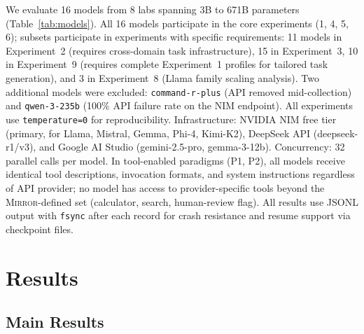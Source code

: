 \documentclass[10pt]{article}
\newcommand{\mirror}{\textsc{Mirror}}
\begin{document}


We evaluate 16 models from 8 labs spanning 3B to 671B parameters
(Table~\ref{tab:models}). All 16 models participate in the core experiments (1, 4, 5, 6); subsets participate in experiments with specific requirements: 11 models in Experiment~2 (requires cross-domain task infrastructure), 15 in Experiment~3, 10 in Experiment~9 (requires complete Experiment~1 profiles for tailored task generation), and 3 in Experiment~8 (Llama family scaling analysis). Two additional models were excluded:
\texttt{command-r-plus} (API removed mid-collection) and \texttt{qwen-3-235b}
(100\% API failure rate on the NIM endpoint). All experiments use
\texttt{temperature=0} for reproducibility. Infrastructure: NVIDIA NIM free tier
(primary, for Llama, Mistral, Gemma, Phi-4, Kimi-K2), DeepSeek API
(deepseek-r1/v3), and Google AI Studio (gemini-2.5-pro, gemma-3-12b).
Concurrency: 32 parallel calls per model.
In tool-enabled paradigms (P1, P2), all models receive identical tool descriptions,
invocation formats, and system instructions regardless of API provider; no model
has access to provider-specific tools beyond the \mirror{}-defined set
(calculator, search, human-review flag). All results use JSONL output with
\texttt{fsync} after each record for crash resistance and resume support via
checkpoint files.

\section{Results}
\label{sec:results}

\subsection{Main Results}
\end{document}
